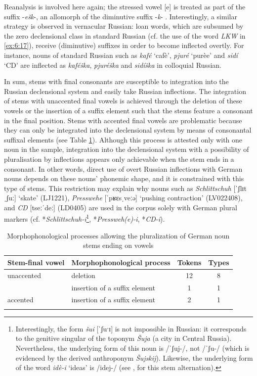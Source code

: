 \noindent Reanalysis is involved here again; the stressed vowel [e] is treated as part of the suffix -\textit{ešk}-, an allomorph of the diminutive suffix -\textit{k}- \citep[2010]{rusgramm-tom1}. Interestingly, a similar strategy is observed in vernacular Russian: loan words, which are subsumed by  the zero declensional class in standard Russian (cf. the use of the word \textit{LKW} in \ref{ex:6:17}), receive (diminutive) suffixes in order to become inflected overtly. For instance, nouns of standard Russian such as \textit{kafé} `cafè', \textit{pjuré} `purèe' and \textit{sidí} ‘CD’ are inflected as \textit{kaféška}, \textit{pjuréška} and \textit{sidíška} in colloquial Russian.\largerpage[-1]

In sum, stems with final consonants are susceptible to integration into the Russian declensional system and easily take Russian inflections. The integration of stems with unaccented final vowels is achieved through the deletion of these vowels or the insertion of a suffix element such that the stems feature a consonant in the final position. Stems with accented final vowels are problematic because they can only be integrated into the declensional system by means of consonantal suffixal elements (see Table \ref{tab:6:4}). Although this process is attested only with one noun in the sample, integration into the declensional system with a possibility of pluralisation by inflections appears only achievable when the stem ends in a consonant. In other words, direct use of overt Russian inflections with German nouns depends on these nouns’ phonemic shape, and it is constrained with this type of stems. This restriction may explain why nouns such as \textit{Schlittschuh} [ˈʃlɪtˌʃuː] `skate' (LJ1221), \textit{Presswehe} [ˈpʁɛsˌveːə] `pushing contraction' (LV022408), and \textit{CD} [tseːˈdeː] (LD0405) are used in the corpus solely with German plural markers (cf. *\textit{Schlittschuh-i}\footnote{Interestingly, the form \textit{šui} [ˈʃuˑɪ] is not impossible in Russian: it corresponds to the genitive singular of the toponym \textit{Šuja} (a city in Central Russia). Nevertheless, the underlying form of this noun is /ˈʃuj-/, not /ˈʃu-/ (which is evidenced by the derived anthroponym \textit{Šujskij}). Likewise, the underlying form of the word \textit{idè-i} `ideas' is /idej-/ (see \citealt[246]{itkin_2007}, for this stem alternation).}, *\textit{Pressweh(e)-i}, *\textit{CD-i}).

\begin{table}
\begin{tabular}{ll cc}
\lsptoprule
	Stem-final vowel & Morphophonological process & Tokens & Types\\\midrule
	unaccented & deletion & 12 & 8\\
               & insertion of a suffix element & 1 & 1\\ \midrule
	accented   & insertion of a suffix element & 2 & 1\\ 
\lspbottomrule
\end{tabular}
	\caption{Morphophonological processes allowing the pluralization of German noun stems ending on vowels\label{tab:6:4}}
\end{table}

